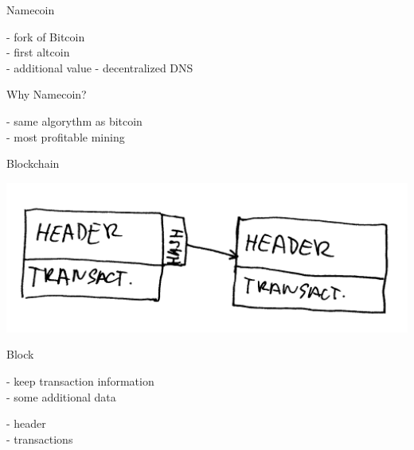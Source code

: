 \documentclass{beamer}
\begin{document}
\begin{frame}

    {\LARGE Namecoin}\\

    \vspace{5mm}

    - fork of Bitcoin\\
    - first altcoin\\
    - additional value - decentralized DNS\\

    \vspace{7mm}

    {\LARGE Why Namecoin?}\\

    \vspace{5mm}

    - same algorythm as bitcoin\\
    - most profitable mining\\

\end{frame}

\begin{frame}

    {\LARGE Blockchain}\\

    \vspace{5mm}

    \includegraphics[scale=0.185]{img/blockchain}

\end{frame}

\begin{frame}

    {\LARGE Block}\\

    \vspace{5mm}

    - keep transaction information\\
    - some additional data\\

    \vspace{5mm}

    - header\\
    - transactions\\

\end{frame}
\end{document}
